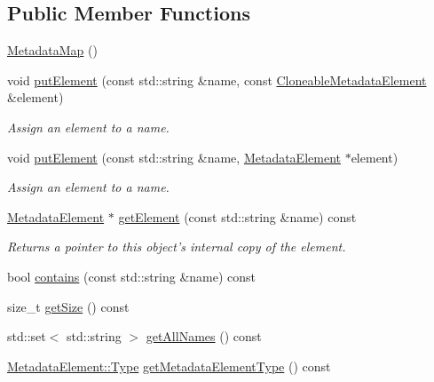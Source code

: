 \subsection*{Public Member Functions}
\begin{DoxyCompactItemize}
\item 
\hyperlink{classBUSBOY_1_1MetadataMap_aa0a5a676c07777bfc8b19d15759d2dd0}{MetadataMap} ()
\item 
void \hyperlink{classBUSBOY_1_1MetadataMap_a5f0c318e585d023fe795c73c383c02ef}{putElement} (const std::string \&name, const \hyperlink{classBUSBOY_1_1CloneableMetadataElement}{CloneableMetadataElement} \&element)
\begin{DoxyCompactList}\small\item\em Assign an element to a name. \item\end{DoxyCompactList}\item 
void \hyperlink{classBUSBOY_1_1MetadataMap_a02a2e69c416662644ca616b0f44c4ad9}{putElement} (const std::string \&name, \hyperlink{classBUSBOY_1_1MetadataElement}{MetadataElement} $\ast$element)
\begin{DoxyCompactList}\small\item\em Assign an element to a name. \item\end{DoxyCompactList}\item 
\hyperlink{classBUSBOY_1_1MetadataElement}{MetadataElement} $\ast$ \hyperlink{classBUSBOY_1_1MetadataMap_a4fa5c6be6a26c7f6066a682e03cb14df}{getElement} (const std::string \&name) const 
\begin{DoxyCompactList}\small\item\em Returns a pointer to this object's internal copy of the element. \item\end{DoxyCompactList}\item 
bool \hyperlink{classBUSBOY_1_1MetadataMap_a590a299a06b9cf089065dfc13bfe0e22}{contains} (const std::string \&name) const 
\item 
size\_\-t \hyperlink{classBUSBOY_1_1MetadataMap_a6652f5ac70ab29a2aaeabe4ebf5e937d}{getSize} () const 
\item 
std::set$<$ std::string $>$ \hyperlink{classBUSBOY_1_1MetadataMap_a40964a5add4322feaadfb1ec5f3486e3}{getAllNames} () const 
\item 
\hyperlink{classBUSBOY_1_1MetadataElement_ab66bf575c7d26f857a2871d42bd97d12}{MetadataElement::Type} \hyperlink{classBUSBOY_1_1MetadataMap_af64fb7f0f22996956ec2adb09892dcb5}{getMetadataElementType} () const 

\end{DoxyCompactItemize}
